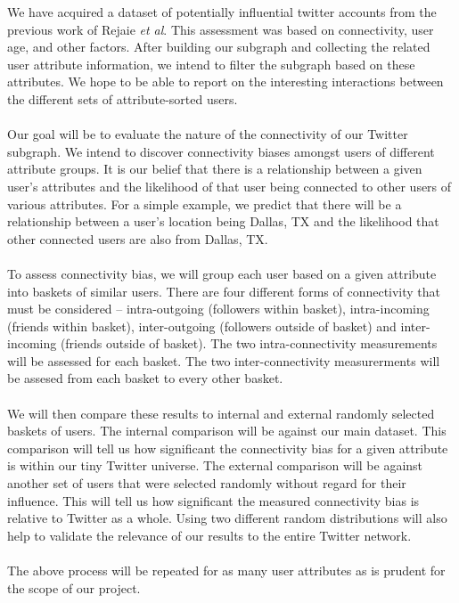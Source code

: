 We have acquired a dataset of potentially influential twitter accounts from the previous work of Rejaie \textit{et al}.  This assessment was based on connectivity, user age, and other factors.  After building our subgraph and collecting the related user attribute information, we intend to filter the subgraph based on these attributes.  We hope to be able to report on the interesting interactions between the different sets of attribute-sorted users.\\\\
Our goal will be to evaluate the nature of the connectivity of our Twitter subgraph.  We intend to discover connectivity biases amongst users of different attribute groups.  It is our belief that there is a relationship between a given user's attributes and the likelihood of that user being connected to other users of various attributes.  For a simple example, we predict that there will be a relationship between a user's location being Dallas, TX and the likelihood that other connected users are also from Dallas, TX.\\\\
To assess connectivity bias, we will group each user based on a given attribute into baskets of similar users.  There are four different forms of connectivity that must be considered -- intra-outgoing (followers within basket), intra-incoming (friends within basket), inter-outgoing (followers outside of basket) and inter-incoming (friends outside of basket).  The two intra-connectivity measurements will be assessed for each basket.  The two inter-connectivity measurerments will be assesed from each basket to every other basket.\\\\
We will then compare these results to internal and external randomly selected baskets of users.  The internal comparison will be against our main dataset.  This comparison will tell us how significant the connectivity bias for a given attribute is within our tiny Twitter universe.  The external comparison will be against another set of users that were selected randomly without regard for their influence.  This will tell us how significant the measured connectivity bias is relative to Twitter as a whole.  Using two different random distributions will also help to validate the relevance of our results to the entire Twitter network.\\\\
The above process will be repeated for as many user attributes as is prudent for the scope of our project.

